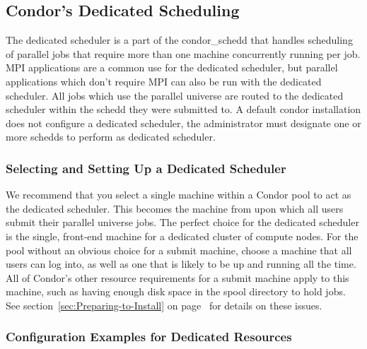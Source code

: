 \subsection{\label{sec:Config-Dedicated-Jobs}
Condor's Dedicated Scheduling} 


The dedicated scheduler is a part of the condor\_schedd that handles scheduling
of parallel jobs that require more than one machine concurrently running per
job.  MPI applications are a common use for the dedicated scheduler, but parallel
applications which don't require MPI can also be run with the dedicated scheduler.
All jobs which use the parallel universe are routed to the dedicated scheduler
within the schedd they were submitted to.  A default condor installation
does not configure a dedicated scheduler, the administrator must designate
one or more schedds to perform as dedicated scheduler.


\subsubsection{\label{sec:Setup-Dedicated-Scheduler}
Selecting and Setting Up a Dedicated Scheduler}

We recommend that you select a single machine within a 
Condor pool to act as the dedicated scheduler.
This becomes the machine from upon which all users submit their 
parallel universe jobs.
The perfect choice for the dedicated scheduler 
is the single, front-end machine for
a dedicated cluster of compute nodes.
For the pool without an obvious choice for a submit machine,
choose a machine that all users can log into, as well as one
that is likely to be up and running all the time.
All of Condor's other resource requirements for a submit machine apply to
this machine, such as having enough disk space in the spool
directory to hold jobs. See section~\ref{sec:Preparing-to-Install} on
page~\pageref{sec:Preparing-to-Install} for details on these issues. 

\subsubsection{\label{sec:Configure-Dedicated-Resource}
Configuration Examples for Dedicated Resources} 

